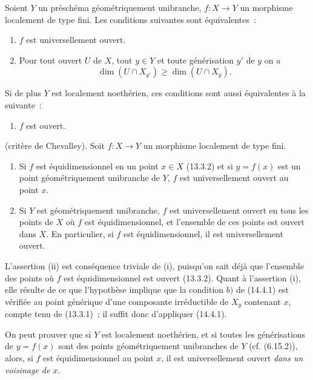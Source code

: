 \begin{corollary}[14.4.3]
\label{IV.14.4.3-fr}
Soient $Y$ un préschéma géométriquement unibranche, $f:X\to Y$ un morphisme
localement de type fini. Les conditions suivantes sont équivalentes~:
\begin{enumerate}[label=\emph{\alph*)}]
  \item $f$ est universellement ouvert.
  \item Pour tout ouvert $U$ de $X$, tout $y\in Y$ et toute générisation $y'$ de
  $y$ on a
  \[
  \dim(U\cap X_{y'})\geq\dim(U\cap X_y).
  \]
\end{enumerate}

Si de plus $Y$ est localement noethérien, ces conditions sont aussi équivalentes à
la suivante~:
\begin{enumerate}[label=\emph{\alph*)}]
  \item[\textup{c)}] $f$ est ouvert.
\end{enumerate}
\end{corollary}

\begin{corollary}[14.4.4]
(critère de Chevalley). Soit $f:X\to Y$ un morphisme localement de type fini.
\begin{enumerate}[label=\textup{(\roman*)}]
  \item Si $f$ est équidimensionnel en un point $x\in X$ \textup{(13.3.2)} et si
  $y=f(x)$ est un point géométriquement unibranche de $Y$, $f$ est
  universellement ouvert au point $x$.
  \item Si $Y$ est géométriquement unibranche, $f$ est universellement ouvert en
  tous les points de $X$ où $f$ est équidimensionnel, et l'ensemble de ces points
  est ouvert dans $X$. En particulier, si $f$ est équidimensionnel, il est
  universellement ouvert.
\end{enumerate}
\end{corollary}

L'assertion (ii) est conséquence triviale de (i), puisqu'on sait déjà que l'ensemble
des points où $f$ est équidimensionnel est ouvert (13.3.2). Quant à l'assertion (i),
elle résulte de ce que l'hypothèse implique que la condition $b)$ de (14.4.1) est
vérifiée au point générique d'une composante irréductible de $X_y$ contenant $x$,
compte tenu de (13.3.1)~; il suffit donc d'appliquer (14.4.1).

\begin{remark}[14.4.5]
\label{IV.14.4.5-fr}
On peut prouver que si $Y$ est localement noethérien, et si toutes les générisations
de $y=f(x)$ sont des points géométriquement unibranches de $Y$ (cf. (6.15.2)),
alors, si $f$ est équidimensionnel au point $x$, il est universellement ouvert
\emph{dans un voisinage de $x$}.
\end{remark}

